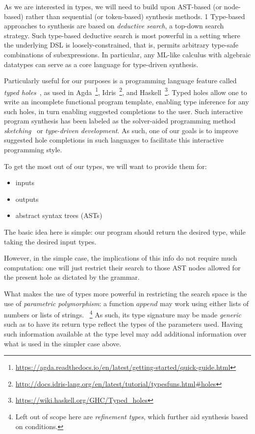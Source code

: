 \documentclass{article}
\begin{document}
As we are interested in types, we will need to build upon AST-based (or node-based) rather than sequential (or token-based) synthesis methods.
1  %
Type-based approaches to synthesis are based on \emph{deductive search}, a top-down search strategy.
Such type-based deductive search is most powerful in a setting where the underlying DSL is loosely-constrained,
that is, permits arbitrary type-safe combinations of subexpressions.
In particular, any ML-like calculus with algebraic datatypes can serve as a core language for type-driven synthesis.~\citep{gulwani2017program}

Particularly useful for our purposes is a programming language feature called \emph{typed holes}~\citep{hashimoto1997typed},
as used in Agda~\footnote{\url{https://agda.readthedocs.io/en/latest/getting-started/quick-guide.html}},
Idris~\footnote{\url{http://docs.idris-lang.org/en/latest/tutorial/typesfuns.html\#holes}},
and Haskell~\footnote{\url{https://wiki.haskell.org/GHC/Typed_holes}}.
Typed holes allow one to write an incomplete functional program template,
enabling type inference for any such holes, in turn enabling suggested completions to the user.
Such interactive program synthesis has been labeled as the solver-aided
programming method \emph{sketching}~\citep{gulwani2017program} or
\emph{type-driven development}.
As such, one of our goals is to improve suggested hole completions in such languages to facilitate this interactive programming style.

To get the most out of our types, we will want to provide them for:
\begin{itemize}
    \item inputs
    \item outputs
    \item abstract syntax trees (ASTs)
\end{itemize}

The basic idea here is simple: our program should return the desired type, while taking the desired input types.

However, in the simple case, the implications of this info do not require much computation:
one will just restrict their search to those AST nodes allowed for the present hole as dictated by the grammar.

What makes the use of types more powerful in restricting the search space is the use of \emph{parametric polymorphism}:
a function $append$ may work using either lists of numbers or lists of strings.
~\footnote{Left out of scope here are \emph{refinement types}, which further aid synthesis based on conditions.}
As such, its type signature may be made \emph{generic} such as to have its return type reflect the types of the parameters used.
Having such information available at the type level may add additional information over what is used in the simpler case above.
\end{document}
